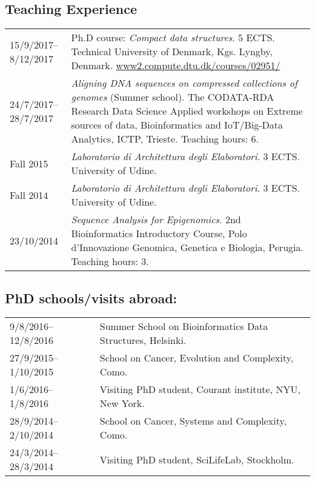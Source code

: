 \documentclass{article}
\begin{document}
\subsection*{Teaching Experience}

\begin{tabular}{p{2cm} p{10cm}}
	15/9/2017--8/12/2017 & Ph.D course: \emph{Compact data structures}. 5 ECTS. Technical University of Denmark, Kgs. Lyngby, Denmark. \url{www2.compute.dtu.dk/courses/02951/}\\
	24/7/2017--28/7/2017 & \emph{Aligning DNA sequences on compressed collections of genomes} (Summer school). The CODATA-RDA Research Data Science Applied workshops on Extreme sources of data, Bioinformatics and IoT/Big-Data Analytics, ICTP, Trieste. Teaching hours: 6.\\
	Fall 2015 & \emph{Laboratorio di Architettura degli
	Elaboratori}. 3 ECTS. University of Udine.\\
	Fall 2014 & \emph{Laboratorio di Architettura degli
	Elaboratori}. 3 ECTS. University of Udine.\\
	23/10/2014 & \emph{Sequence Analysis for Epigenomics}. 2nd Bioinformatics Introductory Course, Polo d’Innovazione Genomica, Genetica e Biologia, Perugia. Teaching hours: 3.\\
\end{tabular}

\subsection*{PhD schools/visits abroad:}

\begin{tabular}{p{2cm} p{10cm}}
	9/8/2016--12/8/2016 & Summer School on Bioinformatics Data Structures, Helsinki.\\
	27/9/2015--1/10/2015 & School on Cancer, Evolution and Complexity, Como.\\
	1/6/2016--1/8/2016 & Visiting PhD student, Courant institute, NYU, New York.\\
	28/9/2014--2/10/2014 & School on Cancer, Systems and Complexity, Como.\\
	24/3/2014--28/3/2014 & Visiting PhD student, SciLifeLab, Stockholm.
\end{tabular}
\end{document}
